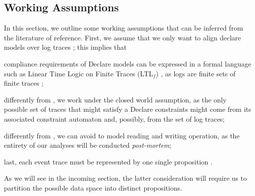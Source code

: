 \subsection{Working Assumptions}\label{sec:wa}
In this section, we outline some working assumptions that can be inferred from the literature of reference. First, we assume that we only want to align declare models over  log traces \cite{XuLZ17a}; this implies that \begin{enumerate*}[label=\emph{\alph*})] \item compliance requirements of Declare models can be expressed in a formal language such as Linear Time Logic on Finite Traces (LTL$_f$) \cite{10.1007/978-3-642-40176-3_8}, as logs are finite sets of finite traces \cite{GiacomoV13}; \item differently from \cite{BurattinMS16,MaggiMB19}, we work under the closed world assumption, as the only possible set of traces that might satisfy a Declare constraints might come from its associated constraint automaton and, possibly, from the set of log traces; \item differently from \cite{MultiPerspective}, we can avoid to model reading and writing operation, as the entirety of our analyses will be conducted \textit{post-mortem}; \item last, each event trace must be represented by one single proposition \cite{XuLZ17a}. \end{enumerate*} As we will see in the incoming section, the latter consideration will require us to partition the possible data space into distinct propositions.






